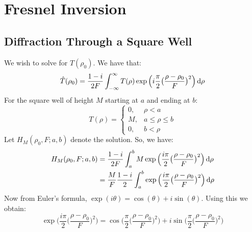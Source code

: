 \section{Fresnel Inversion}
    \subsection{Diffraction Through a Square Well}
        \label{Subsec:Cassini_Math_Diffraction_Through_a_Square_well}
        We wish to solve for $\hat{T}(\rho_{0})$. We have that:
        \begin{equation}
            \hat{T}(\rho_{0})
            =\frac{1-i}{2F}
                \int_{-\infty}^{\infty}T(\rho)
                \exp\Big(i\frac{\pi}{2}
                    \big(\frac{\rho-\rho_{0}}{F}\big)^{2}\Big)
                \mathop{}\!\mathrm{d}{\rho}
        \end{equation}
        For the square well of height $M$
        starting at $a$ and ending at $b$:
        \begin{equation}
            T(\rho)=
            \begin{cases}
                0,&\rho<a\\
                M,&a\leq\rho\leq{b}\\
                0,&b<\rho
            \end{cases}
        \end{equation}
        Let $H_{M}(\rho_0,F;a,b)$ denote the solution.
        So, we have:
        \begin{subequations}
            \begin{align}
                H_{M}(\rho_0,F;a,b)
                &=\frac{1-i}{2F}\int_{a}^{b}M
                    \exp\Big(
                        \frac{i\pi}{2}
                        \big(\frac{\rho-\rho_{0}}{F}\big)^{2}
                    \Big)\mathop{}\!\mathrm{d}{\rho}\\
                &=\frac{M}{F}\frac{1-i}{2}
                    \int_{a}^{b}
                    \exp\Big(
                        \frac{i\pi}{2}
                        \big(\frac{\rho-\rho_{0}}{F}\big)^{2}
                    \Big)\mathop{}\!\mathrm{d}{\rho}
            \end{align}
        \end{subequations}
        Now from Euler's formula,
        $\exp(i\theta)=\cos(\theta)+i\sin(\theta).$
        Using this we obtain:
        \begin{equation}
            \exp\Big(
                \frac{i\pi}{2}
                \big(\frac{\rho-\rho_{0}}{F}\big)^{2}
            \Big)
            =\cos\Big(
                \frac{\pi}{2}
                \big(\frac{\rho-\rho_{0}}{F}\big)^{2}
            \Big)+
            i\sin\Big(
                \frac{\pi}{2}
                \big(\frac{\rho-\rho_{0}}{F}\big)^{2}
            \Big)
        \end{equation}
